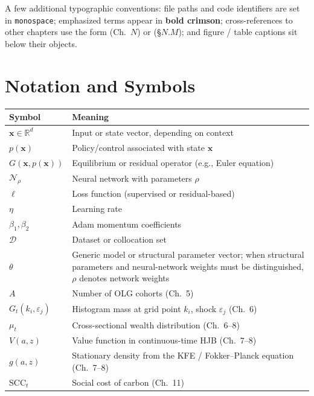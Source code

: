\documentclass[11pt,a4paper]{report}
\newcommand{\x}{\bm{x}}
\newcommand{\R}{\mathbb{R}}
\newcommand{\emphc}[1]{\textcolor{harvardcrimson}{\textbf{#1}}}
\begin{document}
A few additional typographic conventions: file paths and code identifiers are set in \texttt{monospace}; emphasized terms appear in \emphc{bold crimson}; cross-references to other chapters use the form (Ch.~$N$) or (\S$N.M$); and figure / table captions sit below their objects.

\chapter*{Notation and Symbols}

\begin{center}
\begin{tabular}{@{}L{3.2cm} L{10.5cm}@{}}
\toprule
Symbol & Meaning \\
\midrule
$\x \in \R^d$ & Input or state vector, depending on context \\
$p(\x)$ & Policy/control associated with state $\x$ \\
$G(\x, p(\x))$ & Equilibrium or residual operator (e.g., Euler equation) \\
$\mathcal{N}_\rho$ & Neural network with parameters $\rho$ \\
$\ell$ & Loss function (supervised or residual-based) \\
$\eta$ & Learning rate \\
$\beta_1, \beta_2$ & Adam momentum coefficients \\
$\mathcal{D}$ & Dataset or collocation set \\
$\theta$ & Generic model or structural parameter vector; when structural parameters and neural-network weights must be distinguished, $\rho$ denotes network weights \\
$A$ & Number of OLG cohorts (Ch.~5) \\
$G_t(k_i, \varepsilon_j)$ & Histogram mass at grid point $k_i$, shock $\varepsilon_j$ (Ch.~6) \\
$\mu_t$ & Cross-sectional wealth distribution (Ch.~6--8) \\
$V(a,z)$ & Value function in continuous-time HJB (Ch.~7--8) \\
$g(a,z)$ & Stationary density from the KFE / Fokker--Planck equation (Ch.~7--8) \\
$\mathrm{SCC}_t$ & Social cost of carbon (Ch.~11) \\
\bottomrule
\end{tabular}
\end{center}
\end{document}
